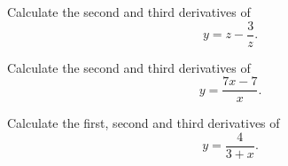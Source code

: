 \documentclass[12pt,addpoints, answers, fleqn]{exam}
\begin{document}
\begin{teacher}
\begin{questions}


\question 	%

Calculate the second and third derivatives of
\[
y = z - \frac{3}{z}.
\]


\question 	%

Calculate the second and third derivatives of
\[
y = \frac{7x-7}{x}.
\]

\question 	%

Calculate the first, second and third derivatives of
\[
y = \frac{4}{3+x}.
\]
\end{questions}
\end{teacher}
\end{document}
